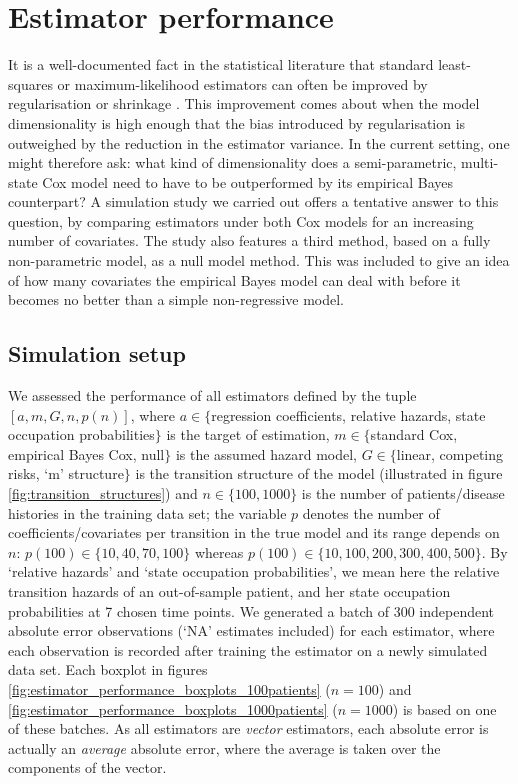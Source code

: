\section{Estimator performance}
\label{sec:estimator_performance}
It is a well-documented fact in the statistical literature that standard least-squares or maximum-likelihood estimators can often be improved by regularisation or shrinkage \citep[see, for example,][]{Samworth2012}. This improvement comes about when the model dimensionality is high enough that the bias introduced by regularisation is outweighed by the reduction in the estimator variance.  In the current setting, one might therefore ask: what kind of dimensionality does a semi-parametric, multi-state Cox model need to have to be outperformed by its empirical Bayes counterpart? 
 A simulation study we carried out offers a tentative answer to this question, by comparing estimators under both Cox models for an increasing number of covariates.  The study also features a third method, based on a fully non-parametric model, as a null model method.  This was included to give an idea of how many covariates the empirical Bayes 
model can deal with before it becomes no better than a simple non-regressive model.

\subsection{Simulation setup}
We assessed the performance of all estimators defined by the tuple $\left[a,m, G, n,p(n)\right]$, where $a\in \lbrace$regression coefficients, relative hazards, state occupation probabilities$\rbrace$ is the target of estimation,  $m\in \lbrace$standard Cox, empirical Bayes Cox, null$\rbrace$ is the assumed hazard model,  $G \in \lbrace$linear, competing risks, `m' structure$\rbrace$ is the transition structure of the model (illustrated in figure \ref{fig:transition_structures}) and $n\in \lbrace 100,1000\rbrace$ is the number of patients/disease histories in the training data set;
the variable $p$ denotes the number of coefficients/covariates per transition in the true model and its range depends on $n$: $p\left(100\right) \in \lbrace 10,40,70,100 \rbrace$ whereas $p\left(100\right) \in \lbrace 10,100,200,300 ,400,500\rbrace$.  By `relative hazards' and `state occupation probabilities', we mean here the relative transition hazards of an out-of-sample patient, and her state occupation probabilities at 7 chosen time points.
We generated a batch of 300 independent absolute error observations (`NA' estimates included) for each estimator, where each observation is recorded after training the estimator on a newly simulated data set.  Each boxplot in figures \ref{fig:estimator_performance_boxplots_100patients} ($n=100$) and \ref{fig:estimator_performance_boxplots_1000patients} ($n=1000$) is based on one of these batches. As all estimators are \textit{vector} estimators,  each absolute error is actually an \textit{average} absolute error, where the average is taken over the components of the vector.

